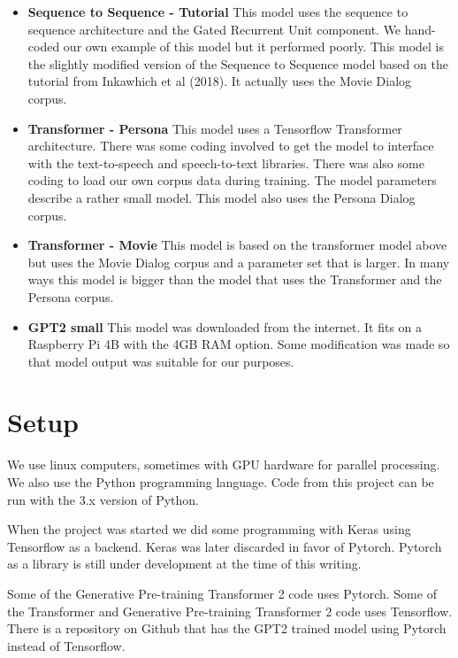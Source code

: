 \begin{itemize}
	\item \textbf{Sequence to Sequence - Tutorial} This model uses the sequence to sequence architecture and the Gated Recurrent Unit component. We hand-coded our own example of this model but it performed poorly. This model is the slightly modified version of the Sequence to Sequence model based on the tutorial from Inkawhich et al (2018)\cite{2018Inkawhich}. It actually uses the Movie Dialog corpus.
	\item \textbf{Transformer - Persona} This model uses a Tensorflow Transformer architecture. There was some coding involved to get the model to interface with the text-to-speech and speech-to-text libraries. There was also some coding to load our own corpus data during training. The model parameters describe a rather small model. This model also uses the Persona Dialog corpus.
	\item \textbf{Transformer - Movie} This model is based on the transformer model above but uses the Movie Dialog corpus and a parameter set that is larger. In many ways this model is bigger than the model that uses the Transformer and the Persona corpus.
	\item \textbf{GPT2 small} This model was downloaded from the internet. It fits on a Raspberry Pi 4B with the 4GB RAM option. Some modification was made so that model output was suitable for our purposes.
\end{itemize}



\section{Setup}

We use linux computers, sometimes with \ac{GPU} hardware for parallel processing. We also use the Python programming language. Code from this project can be run with the 3.x version of Python.

When the project was started we did some programming with Keras using
Tensorflow as a backend. Keras was later discarded in favor of Pytorch.
Pytorch as a library is still under development at the time of this
writing.

Some of the Generative Pre-training Transformer 2 code uses Pytorch. Some of the Transformer and Generative Pre-training Transformer 2 code uses Tensorflow. There is a repository on Github that has the GPT2 trained model using Pytorch instead of Tensorflow.

